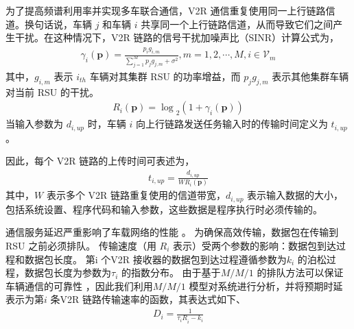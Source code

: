 为了提高频谱利用率并实现多车联合通信，V2R 通信重复使用同一上行链路信道。换句话说，车辆 $j$ 和车辆 $i$ 共享同一个上行链路信道，从而导致它们之间产生干扰。在这种情况下，V2R 链路的信号干扰加噪声比（SINR）计算公式为，
\begin{eqnarray}\label{E3}
\gamma_i\left(\mathbf{p}\right)=\frac{p_ig_{i,m}}{{\sum_{j=1}^{M}{p_jg_{j,m}}+\sigma^2}}, m=1,2,\cdots ,M , i\in {{\mathcal{V}}_{m}}
\end{eqnarray}
其中，$g_{i,m}$ 表示 $i_{th}$ 车辆对其集群 RSU 的功率增益，而 ${p_jg_{j,m}}$ 表示其他集群车辆对当前 RSU 的干扰。
\begin{eqnarray}\label{E4}
{R_i\left(\mathbf{p}\right)=\log}_2{\left(1+ \gamma_i\left(\mathbf{p}\right) \right)}
\end{eqnarray}
当输入参数为 $d_{i,up}$ 时，车辆 $i$ 向上行链路发送任务输入时的传输时间定义为 $t_{i,up}$。

因此，每个 V2R 链路的上传时间可表述为，
\begin{eqnarray}\label{E6}
t_{i,up}=\frac{d_{i,up}}{WR_i\left(\mathbf{p}\right)}
\end{eqnarray}
其中，$W$ 表示多个 V2R 链路重复使用的信道带宽，$d_{i,up}$ 表示输入数据的大小，包括系统设置、程序代码和输入参数，这些数据是程序执行时必须传输的。

通信服务延迟严重影响了车载网络的性能 \cite{RAI}。 为确保高效传输，数据包在传输到 RSU 之前必须排队。 传输速度（用 $R_i$ 表示）受两个参数的影响：数据包到达过程和数据包长度。  第i 个V2R 接收器的数据包到达过程遵循参数为$k_i$ 的泊松过程，数据包长度为参数为$\tau_i$ 的指数分布。 由于基于$M/M/1$ 的排队方法可以保证车辆通信的可靠性 \cite{Guo2019}，因此我们利用$M/M/1$ 模型对系统进行分析，并将预期时延表示为第$i$ 条V2R 链路传输速率的函数，其表达式如下、
\begin{eqnarray}\label{E7}
D_i=\frac{1}{{\tau_iR}_i-k_i}
\end{eqnarray}

